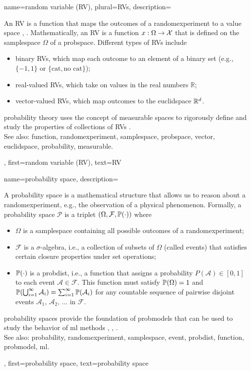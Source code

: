 {name={random variable (RV)}, plural={RVs},
 	description={An RV is a \gls{function} that maps the 
		outcomes of a \gls{randomexperiment} to a value space \cite{BillingsleyProbMeasure}, \cite{GrayProbBook}. 
 		Mathematically, an RV is a \gls{function} $x: \Omega \rightarrow \mathcal{X}$ that is defined on the 
		\gls{samplespace} $\Omega$ of a \gls{probspace}.
 		Different types of RVs include  
 		\begin{itemize} 
 			\item {binary RVs}, which map each outcome to an element of a binary set (e.g., $\{-1,1\}$ or $\{\text{cat}, \text{no cat}\}$); 
 			\item {real-valued RVs}, which take on values in the real numbers $\mathbb{R}$;  
 			\item {\gls{vector}-valued RVs}, which map outcomes to the \gls{euclidspace} $\mathbb{R}^{d}$.  
 		\end{itemize} 
 		\Gls{probability} theory uses the concept of \gls{measurable} spaces to rigorously define 
 		and study the properties of collections of RVs \cite{BillingsleyProbMeasure}.
			\\
		See also: \gls{function}, \gls{randomexperiment}, \gls{samplespace}, \gls{probspace}, \gls{vector}, \gls{euclidspace}, \gls{probability}, \gls{measurable}.}, 
	first={random variable (RV)},
	text={RV}  
}
 
 {name={probability space}, 
 	description={A \gls{probability} space is a mathematical 
 		structure that allows us to reason about a \gls{randomexperiment}, e.g., the observation 
		of a physical phenomenon. 
 	   	Formally, a \gls{probability} space $\mathcal{P}$ is a triplet $(\Omega, \mathcal{F}, \mathbb{P}({\cdot}))$ where
 		\begin{itemize} 
 			\item  $\Omega$ is a \gls{samplespace} containing all possible outcomes of a \gls{randomexperiment};
 			\item  $\mathcal{F}$ is a $\sigma$-algebra, i.e., a collection of subsets of $\Omega$ (called \glspl{event}) that satisfies 
 			certain closure properties under set operations;
 			\item $\mathbb{P}({\cdot})$ is a \gls{probdist}, i.e., a \gls{function} that assigns a \gls{probability} $P(\mathcal{A}) \in [0,1]$ 
 			to each \gls{event} $\mathcal{A} \in \mathcal{F}$. This \gls{function} must satisfy $\mathbb{P}({\Omega}) = 1$ and 
			$\mathbb{P}({\bigcup_{i=1}^{\infty} \mathcal{A}_i}) = \sum_{i=1}^{\infty} \mathbb{P}({\mathcal{A}_i})$ for any 
 			countable sequence of pairwise disjoint \glspl{event} $\mathcal{A}_1, \,\mathcal{A}_2, \,\ldots$ in $\mathcal{F}$.
 		\end{itemize}
 		\Gls{probability} spaces provide the foundation of \glspl{probmodel} that can be 
		used to study the behavior of \gls{ml} methods \cite{BillingsleyProbMeasure}, \cite{GrayProbBook}, \cite{ross2013first}.
				\\
		See also: \gls{probability}, \gls{randomexperiment}, \gls{samplespace}, \gls{event}, \gls{probdist}, \gls{function}, \gls{probmodel}, \gls{ml}.},  
 	first={probability space}, 
 	text={probability space}
 }
 
